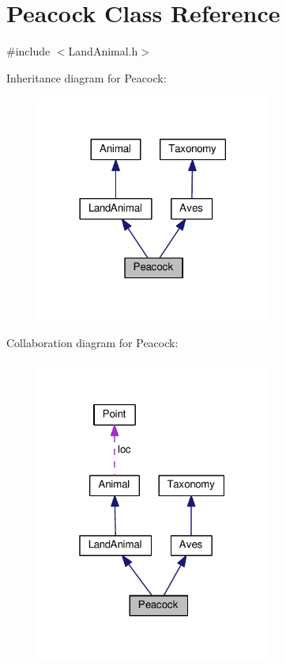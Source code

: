 \hypertarget{classPeacock}{}\section{Peacock Class Reference}
\label{classPeacock}


{\ttfamily \#include $<$Land\+Animal.\+h$>$}



Inheritance diagram for Peacock\+:
\nopagebreak
\begin{figure}[H]
\begin{center}
\leavevmode
\includegraphics[width=218pt]{classPeacock__inherit__graph}
\end{center}
\end{figure}


Collaboration diagram for Peacock\+:
\nopagebreak
\begin{figure}[H]
\begin{center}
\leavevmode
\includegraphics[width=217pt]{classPeacock__coll__graph}
\end{center}
\end{figure}
